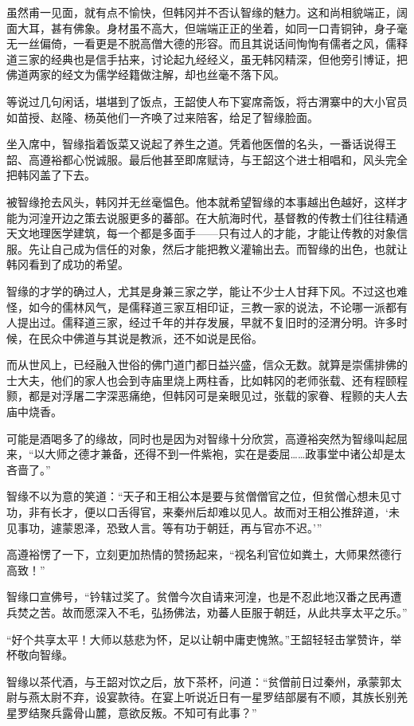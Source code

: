 虽然甫一见面，就有点不愉快，但韩冈并不否认智缘的魅力。这和尚相貌端正，阔面大耳，甚有佛象。身材虽不高大，但端端正正的坐着，如同一口青铜钟，身子毫无一丝偏倚，一看更是不脱高僧大德的形容。而且其说话间恂恂有儒者之风，儒释道三家的经典也是信手拈来，讨论起九经经义，虽无韩冈精深，但他旁引博证，把佛道两家的经文为儒学经籍做注解，却也丝毫不落下风。

等说过几句闲话，堪堪到了饭点，王韶使人布下宴席斋饭，将古渭寨中的大小官员如苗授、赵隆、杨英他们一齐唤了过来陪客，给足了智缘脸面。

坐入席中，智缘指着饭菜又说起了养生之道。凭着他医僧的名头，一番话说得王韶、高遵裕都心悦诚服。最后他甚至即席赋诗，与王韶这个进士相唱和，风头完全把韩冈盖了下去。

被智缘抢去风头，韩冈并无丝毫愠色。他本就希望智缘的本事越出色越好，这样才能为河湟开边之策去说服更多的蕃部。在大航海时代，基督教的传教士们往往精通天文地理医学建筑，每一个都是多面手——只有过人的才能，才能让传教的对象信服。先让自己成为信任的对象，然后才能把教义灌输出去。而智缘的出色，也就让韩冈看到了成功的希望。

智缘的才学的确过人，尤其是身兼三家之学，能让不少士人甘拜下风。不过这也难怪，如今的儒林风气，是儒释道三家互相印证，三教一家的说法，不论哪一派都有人提出过。儒释道三家，经过千年的并存发展，早就不复旧时的泾渭分明。许多时候，在民众中佛道与其说是教派，还不如说是民俗。

而从世风上，已经融入世俗的佛门道门都日益兴盛，信众无数。就算是崇儒排佛的士大夫，他们的家人也会到寺庙里烧上两柱香，比如韩冈的老师张载、还有程颐程颢，都是对浮屠二字深恶痛绝，但韩冈可是亲眼见过，张载的家眷、程颢的夫人去庙中烧香。

可能是酒喝多了的缘故，同时也是因为对智缘十分欣赏，高遵裕突然为智缘叫起屈来，“以大师之德才兼备，还得不到一件紫袍，实在是委屈……政事堂中诸公却是太吝啬了。”

智缘不以为意的笑道：“天子和王相公本是要与贫僧僧官之位，但贫僧心想未见寸功，非有长才，便以口舌得官，来秦州后却难以见人。故而对王相公推辞道，‘未见事功，遽蒙恩泽，恐致人言。等有功于朝廷，再与官亦不迟。’”

高遵裕愣了一下，立刻更加热情的赞扬起来，“视名利官位如粪土，大师果然德行高致！”

智缘口宣佛号，“钤辖过奖了。贫僧今次自请来河湟，也是不忍此地汉番之民再遭兵焚之苦。故而愿深入不毛，弘扬佛法，劝蕃人臣服于朝廷，从此共享太平之乐。”

“好个共享太平！大师以慈悲为怀，足以让朝中庸吏愧煞。”王韶轻轻击掌赞许，举杯敬向智缘。

智缘以茶代酒，与王韶对饮之后，放下茶杯，问道：“贫僧前日过秦州，承蒙郭太尉与燕太尉不弃，设宴款待。在宴上听说近日有一星罗结部屡有不顺，其族长别羌星罗结聚兵露骨山麓，意欲反叛。不知可有此事？”

